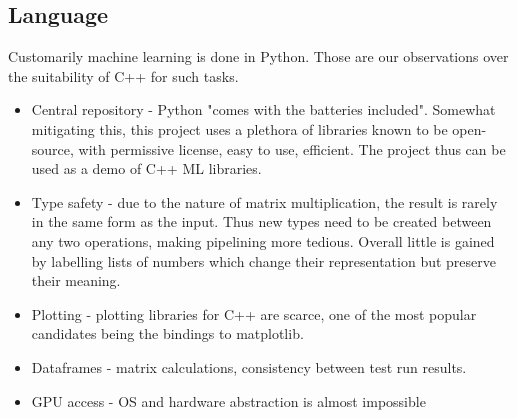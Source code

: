 \documentclass{article}
\begin{document}
\subsection{Language}
Customarily machine learning is done in Python.
Those are our observations over the suitability of C++ for such tasks.
\begin{itemize}
\item{Central repository - Python "comes with the batteries included".
                           Somewhat mitigating this, this project uses a plethora of libraries known to be open-source, with permissive license, easy to use, efficient.
                           The project thus can be used as a demo of C++ ML libraries.
}
\item{Type safety - due to the nature of matrix multiplication, the result is rarely in the same form as the input.
                    Thus new types need to be created between any two operations, making pipelining more tedious.
                    Overall little is gained by labelling lists of numbers which change their representation but preserve their meaning.}
\item{Plotting - plotting libraries for C++ are scarce, one of the most popular candidates being the bindings to matplotlib.}
\item{Dataframes - matrix calculations, consistency between test run results.}
\item{GPU access - OS and hardware abstraction is almost impossible}
\end{itemize}


\printbibliography
\end{document}
